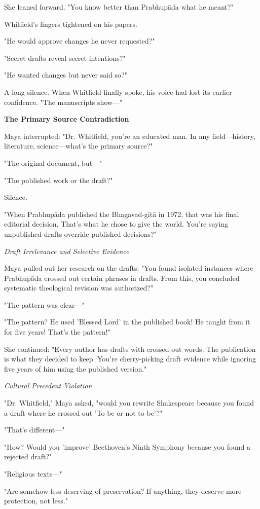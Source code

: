 \documentclass[12pt]{article}
\begin{document}
She leaned forward. "You know better than Prabhupāda what he meant?"

Whitfield's fingers tightened on his papers.

"He would approve changes he never requested?"

"Secret drafts reveal secret intentions?"

"He wanted changes but never said so?"

A long silence. When Whitfield finally spoke, his voice had lost its earlier confidence. "The manuscripts show—"

\textbf{The Primary Source Contradiction}

Maya interrupted: "Dr. Whitfield, you're an educated man. In any field—history, literature, science—what's the primary source?"

"The original document, but—"

"The published work or the draft?"

Silence.

"When Prabhupāda published the Bhagavad-gītā in 1972, that was his final editorial decision. That's what he chose to give the world. You're saying unpublished drafts override published decisions?"

\textit{Draft Irrelevance and Selective Evidence}

Maya pulled out her research on the drafts: "You found isolated instances where Prabhupāda crossed out certain phrases in drafts. From this, you concluded systematic theological revision was authorized?"

"The pattern was clear—"

"The pattern? He used 'Blessed Lord' in the published book! He taught from it for five years! That's the pattern!"

She continued: "Every author has drafts with crossed-out words. The publication is what they decided to keep. You're cherry-picking draft evidence while ignoring five years of him using the published version."

\textit{Cultural Precedent Violation}

"Dr. Whitfield," Maya asked, "would you rewrite Shakespeare because you found a draft where he crossed out 'To be or not to be'?"

"That's different—"

"How? Would you 'improve' Beethoven's Ninth Symphony because you found a rejected draft?"

"Religious texts—"

"Are somehow less deserving of preservation? If anything, they deserve more protection, not less."
\end{document}

